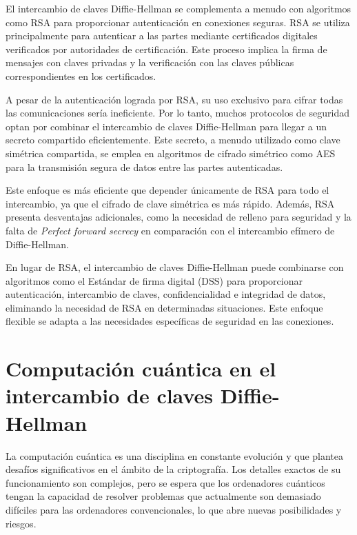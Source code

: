 \documentclass[11pt]{article}
\begin{document}
El intercambio de claves Diffie-Hellman se complementa a menudo con algoritmos como RSA para proporcionar autenticación en conexiones seguras. RSA se utiliza principalmente para autenticar a las partes mediante certificados digitales verificados por autoridades de certificación. Este proceso implica la firma de mensajes con claves privadas y la verificación con las claves públicas correspondientes en los certificados.

A pesar de la autenticación lograda por RSA, su uso exclusivo para cifrar todas las comunicaciones sería ineficiente. Por lo tanto, muchos protocolos de seguridad optan por combinar el intercambio de claves Diffie-Hellman para llegar a un secreto compartido eficientemente. Este secreto, a menudo utilizado como clave simétrica compartida, se emplea en algoritmos de cifrado simétrico como AES para la transmisión segura de datos entre las partes autenticadas.

Este enfoque es más eficiente que depender únicamente de RSA para todo el intercambio, ya que el cifrado de clave simétrica es más rápido. Además, RSA presenta desventajas adicionales, como la necesidad de relleno para seguridad y la falta de \emph{Perfect forward secrecy} en comparación con el intercambio efímero de Diffie-Hellman.

En lugar de RSA, el intercambio de claves Diffie-Hellman puede combinarse con algoritmos como el Estándar de firma digital (DSS) para proporcionar autenticación, intercambio de claves, confidencialidad e integridad de datos, eliminando la necesidad de RSA en determinadas situaciones. Este enfoque flexible se adapta a las necesidades específicas de seguridad en las conexiones.


\section{Computación cuántica en el intercambio de claves Diffie-Hellman}

La computación cuántica es una disciplina en constante evolución y que plantea desafíos significativos en el ámbito de la criptografía. Los detalles exactos de su funcionamiento son complejos, pero se espera que los ordenadores cuánticos tengan la capacidad de resolver problemas que actualmente son demasiado difíciles para las ordenadores convencionales, lo que abre nuevas posibilidades y riesgos.
\end{document}
